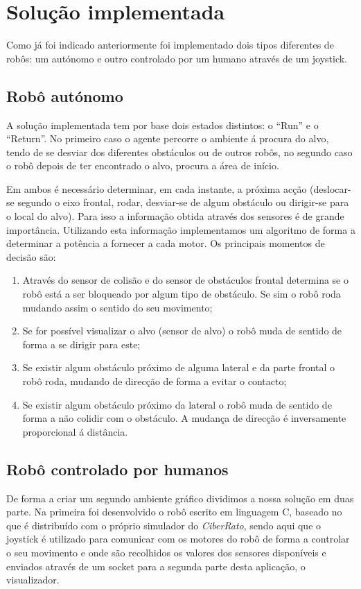 \documentclass[conference]{IEEEtran}
\begin{document}
\section{Solução implementada}
Como já foi indicado anteriormente foi implementado dois tipos diferentes de robôs: um autónomo e outro controlado por um humano através de um joystick.

\subsection{Robô autónomo}
A solução implementada tem por base dois estados distintos: o “Run” e o “Return”. No primeiro caso o agente percorre o ambiente á procura do alvo, tendo de se desviar dos diferentes obstáculos ou de outros robôs, no segundo caso o robô depois de ter encontrado o alvo, procura a área de início. 

Em ambos é necessário determinar, em cada instante, a próxima acção (deslocar-se segundo o eixo frontal, rodar, desviar-se de algum obstáculo ou dirigir-se para o local do alvo). Para isso a informação obtida através dos sensores é de grande importância. Utilizando esta informação implementamos um algoritmo de forma a determinar a potência a fornecer a cada motor. Os principais momentos de decisão são:

\begin{enumerate}
\item Através do sensor de colisão e do sensor de obstáculos frontal determina se o robô está a ser bloqueado por algum tipo de obstáculo. Se sim o robô roda mudando assim o sentido do seu movimento;
\item Se for possível visualizar o alvo (sensor de alvo) o robô muda de sentido de forma a se dirigir para este;
\item Se existir algum obstáculo próximo de alguma lateral e da parte frontal o robô roda, mudando de direcção de forma a evitar o contacto;
\item Se existir algum obstáculo próximo da lateral o robô muda de sentido de forma a não colidir com o obstáculo. A mudança de direcção é inversamente proporcional á distância.
\end{enumerate}

\subsection{Robô controlado por humanos}
De forma a criar um segundo ambiente gráfico dividimos a nossa solução em duas parte. Na primeira foi desenvolvido o robô escrito em linguagem C, baseado no  que é distribuído com o próprio simulador do \textit{CiberRato}, sendo aqui que o joystick é utilizado para comunicar com os motores do robô de forma a controlar o seu movimento e onde são recolhidos os valores dos sensores disponíveis e enviados através de um socket para a segunda parte desta aplicação, o visualizador.
\end{document}
